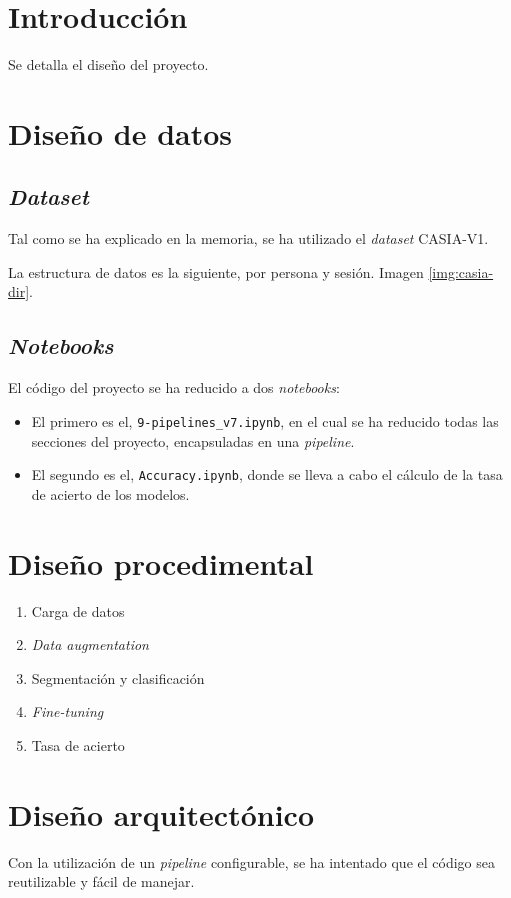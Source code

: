 
\section{Introducción}

Se detalla el diseño del proyecto.

\section{Diseño de datos}

\subsection{\textit{Dataset}} \label{anx:dataset}

Tal como se ha explicado en la memoria, se ha utilizado el \textit{dataset} CASIA-V1.

La estructura de datos es la siguiente, por persona y sesión. Imagen \ref{img:casia-dir}.


\subsection{\textit{Notebooks}}

El código del proyecto se ha reducido a dos \textit{notebooks}:


\begin{itemize}
    \item El primero es el, \texttt{9-pipelines\_v7.ipynb}, en el cual se ha reducido todas las secciones del proyecto, encapsuladas en una \textit{pipeline}.
    \item El segundo es el, \texttt{Accuracy.ipynb}, donde se lleva a cabo el cálculo de la tasa de acierto de los modelos.
\end{itemize}


\section{Diseño procedimental}

\begin{enumerate}
    \item Carga de datos
    \item \textit{Data augmentation}
    \item Segmentación y clasificación
    \item \textit{Fine-tuning}
    \item Tasa de acierto
    \end{enumerate}

\section{Diseño arquitectónico}

Con la utilización de un \textit{pipeline} configurable, se ha intentado que el código sea reutilizable y fácil de manejar.
